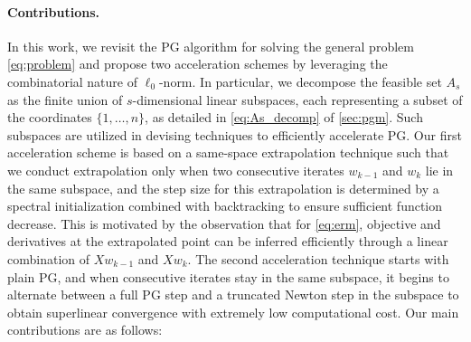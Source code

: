\documentclass{article}
\theoremstyle{plain}
\theoremstyle{definition}
\theoremstyle{remark}
\begin{document}
\paragraph{Contributions.} In this work, we revisit the PG
algorithm for solving the general problem
\cref{eq:problem} and propose two acceleration schemes by leveraging the 
combinatorial nature of $\ell_0$-norm.
In particular, we decompose the feasible set $A_s$ as the finite union
of $s$-dimensional linear subspaces, each representing a subset of the
coordinates $\{1,\dotsc,n\}$, as
detailed in \cref{eq:As_decomp} of \cref{sec:pgm}. Such subspaces are utilized 
in devising techniques to efficiently accelerate
PG.
Our first acceleration scheme is based on a same-space extrapolation
technique such that we
conduct extrapolation only when two consecutive iterates $w_{k-1}$ and
$w_k$ lie in the same %
subspace, and the step size for this
extrapolation is determined by a spectral initialization combined with
backtracking %
to ensure sufficient function decrease.
This %
is motivated by the observation that for \cref{eq:erm},
objective and derivatives at the extrapolated point can be inferred
efficiently through a linear combination of $X w_{k-1}$ and $X w_{k}$.
The second acceleration technique starts with plain PG, and
when consecutive iterates stay in the same subspace, it
begins to alternate between a full PG step and a truncated Newton step
in the subspace to obtain superlinear convergence with extremely low
computational cost.
Our main contributions are as follows:
\end{document}
